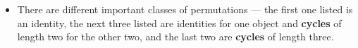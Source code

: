 \documentclass[../apprentice.tex]{subfiles}
\begin{document}
\begin{itemize}
\begin{itemize}
\begin{itemize}
\begin{align*}
                    \begin{pmatrix}
                        1 & 2 & 3\\
                        2 & 1 & 3\\
                    \end{pmatrix},
                    \begin{pmatrix}
                        1 & 2 & 3\\
                        3 & 2 & 1\\
                    \end{pmatrix},
                    \begin{pmatrix}
                        1 & 2 & 3\\
                        1 & 3 & 2\\
                    \end{pmatrix},
                    \begin{pmatrix}
                        1 & 2 & 3\\
                        2 & 3 & 1\\
                    \end{pmatrix},
                    \begin{pmatrix}
                        1 & 2 & 3\\
                        3 & 1 & 2\\
                    \end{pmatrix}
                \right\}\\
                &= \left\{
                    \permtwo{1}{2}{3},
                    \permtwo{2}{1}{3},
                    \permtwo{3}{2}{1},
                    \permtwo{1}{3}{2},
                    \permtwo{2}{3}{1},
                    \permtwo{3}{1}{2}
                \right\}
            \end{align*}
            \item There are different important classes of permutations --- the first one listed is an identity, the next three listed are identities for one object and \textbf{cycles} of length two for the other two, and the last two are \textbf{cycles} of length three.

\end{itemize}
\end{itemize}
\end{itemize}
\end{document}

